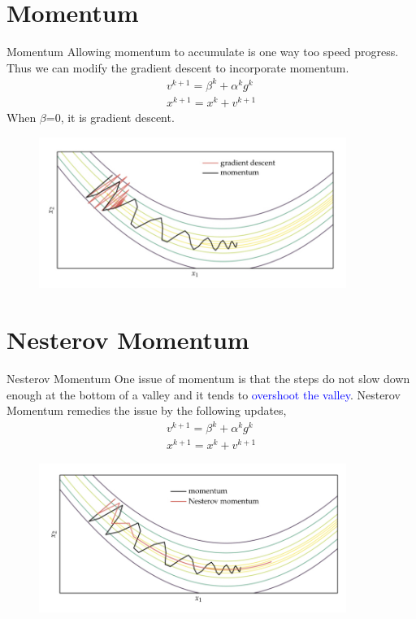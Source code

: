 \documentclass{beamer}
\begin{document}
\section{Momentum}
\begin{frame}{Momentum}
Allowing momentum to accumulate is one way too speed progress. 
Thus we can modify the gradient descent to incorporate momentum.
\begin{gather*}
    v^{k+1} = \beta^k + \alpha^k g^k \\
    x^{k+1} = x^k + v^{k+1} 
\end{gather*}
When $\beta$=0, it is gradient descent. 
\begin{figure}
\centering
\includegraphics[width=100mm]{Figs/momentum.jpeg}
\end{figure}


\end{frame}

\section{Nesterov Momentum}
\begin{frame}{Nesterov Momentum}
One issue of momentum is that the steps do not slow down enough at the bottom of a valley and it tends to \textcolor{blue}{overshoot the valley}. Nesterov Momentum remedies the issue by the following updates,
\begin{gather*}
    v^{k+1} = \beta^k + \alpha^k g^k \\
    x^{k+1} = x^k + v^{k+1} 
\end{gather*}

\begin{figure}
\centering
\includegraphics[width=100mm]{Figs/n-momentum.jpeg}
\end{figure}

\end{frame}
\end{document}
